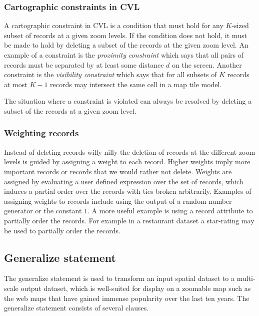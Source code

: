 \subsubsection{Cartographic constraints in CVL}

A cartographic constraint in CVL is a condition that must hold for any $K$-sized subset of records at a given zoom levels. If the condition does not hold, it must be made to hold by deleting a subset of the records at the given zoom level. An example of a constraint is the \emph{proximity constraint} which says that all pairs of records must be separated by at least some distance $d$ on the screen. Another constraint is the \emph{visibility constraint} which says that for all subsets of $K$ records at most $K-1$ records may intersect the same cell in a map tile model.

The situation where a constraint is violated can always be resolved by deleting a subset of the records at a given zoom level.

\subsubsection{Weighting records}
Instead of deleting records willy-nilly the deletion of records at the different zoom levels is guided by assigning a weight to each record. Higher weights imply more important records or records that we would rather not delete. Weights are assigned by evaluating a user defined expression over the set of records, which induces a partial order over the records with ties broken arbitrarily. Examples of assigning weights to records include using the output of a random number generator or the constant $1$. A more useful example is using a record attribute to partially order the records. For example in a restaurant dataset a star-rating may be used to partially order the records.


\subsection{Generalize statement}
The generalize statement is used to transform an input spatial dataset to a multi-scale output dataset, which is well-suited for display on a zoomable map such as the web maps that have gained immense popularity over the last ten years. The generalize statement consists of several clauses. 

